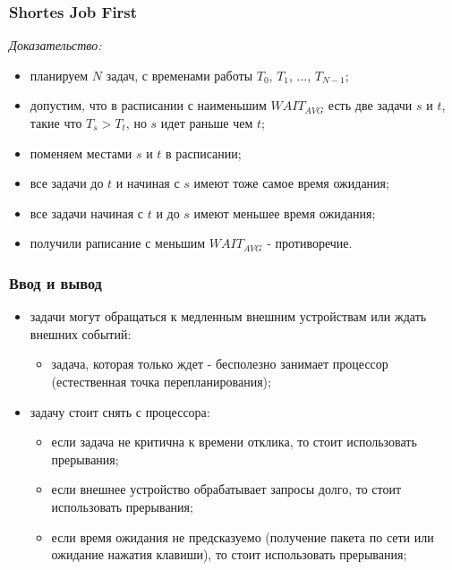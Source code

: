 \begin{frame}
\frametitle{Shortes Job First}

\emph{Доказательство:}
\begin{itemize}
  \item планируем $N$ задач, с временами работы $T_0$, $T_1$, ..., $T_{N-1}$;
  \item допустим, что в расписании с наименьшим $WAIT_{AVG}$ есть две
        задачи $s$ и $t$, такие что $T_s > T_t$, но $s$ идет раньше чем $t$;
  \item поменяем местами $s$ и $t$ в расписании;
  \item все задачи до $t$ и начиная с $s$ имеют тоже самое время ожидания;
  \item все задачи начиная с $t$ и до $s$ имеют меньшее время ожидания;
  \item получили раписание с меньшим $WAIT_{AVG}$ - противоречие.
\end{itemize}
\end{frame}

\begin{frame}
\frametitle{Ввод и вывод}

\begin{itemize}
  \item<1-> задачи могут обращаться к медленным внешним устройствам или ждать
            внешних событий:
              \begin{itemize}
                \item задача, которая только ждет - бесполезно занимает
                      процессор (естественная точка перепланирования);
              \end{itemize}
  \item<2-> задачу стоит снять с процессора:
     \begin{itemize}
       \item если задача не критична к времени отклика, то стоит использовать
             прерывания;
       \item если внешнее устройство обрабатывает запросы долго, то стоит
             использовать прерывания;
       \item если время ожидания не предсказуемо (получение пакета по сети или
             ожидание нажатия клавиши), то стоит использовать прерывания;
     \end{itemize}
\end{itemize}
\end{frame}


